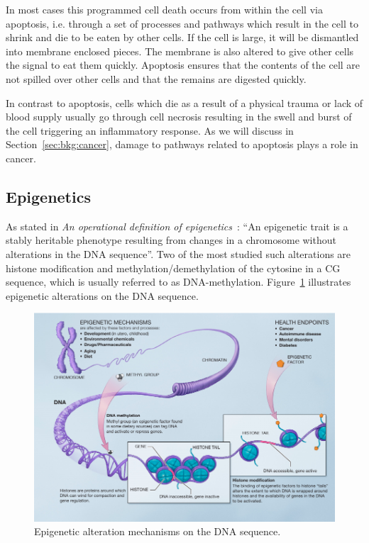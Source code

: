 In most cases this programmed cell death occurs from within the cell via apoptosis, i.e. through a set of processes and pathways which result in the cell to shrink and die to be eaten by other cells. If the cell is large, it will be dismantled into membrane enclosed pieces. The membrane is also altered to give other cells the signal to eat them quickly. Apoptosis ensures that the contents of the cell are not spilled over other cells and that the remains are digested quickly.

In contrast to apoptosis, cells which die as a result of a physical trauma or lack of blood supply usually go through cell necrosis resulting in the swell and burst of the cell triggering an inflammatory response. As we will discuss in Section~\ref{sec:bkg:cancer}, damage to pathways related to apoptosis plays a role in cancer.

\subsection{Epigenetics}
As stated in \emph{An operational definition of epigenetics}~\cite{berger2009operational}: ``An epigenetic trait is a stably heritable phenotype resulting from changes in a chromosome without alterations in the DNA sequence''. Two of the most studied such alterations are histone modification and methylation/demethylation of the cytosine in a CG sequence, which is usually referred to as DNA-methylation. Figure~\ref{fig:bkg:epigenetics} illustrates epigenetic alterations on the DNA sequence.

\begin{figure}[!ht]
  \centering
  \includegraphics[width=1\textwidth]{figs/background/epigeneticmechanisms}
  \caption[Epigenetic alteration mechanisms on the DNA sequence.]{Epigenetic alteration mechanisms on the DNA sequence\protect\footnotemark.}
  \label{fig:bkg:epigenetics}
\end{figure}

